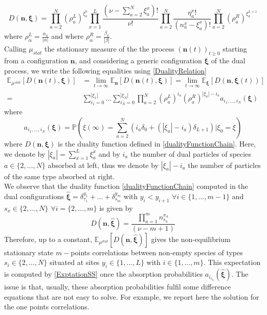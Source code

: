 \documentclass[11pt]{article}
\numberwithin{equation}{section}
\numberwithin{equation}{subsection}
\begin{document}
\begin{equation}\label{dualityFunctionChain}
	D(\bm{n},\bm{\xi})=\prod_{a=2}^{N}\left(\rho_{a}^{L}\right)^{\xi_{a}^{0}}\prod_{x=1}^{L}\frac{(\nu-\sum_{a=2}^{N}\xi_{a}^{x})!}{\nu!}\prod_{a=2}^{N}\frac{\eta_{a}^{x}!}{(n_{a}^{x}-\xi_{a}^{x})!}\prod_{a=2}^{N}\left(\rho_{a}^{R}\right)^{\xi_{a}^{L+1}}
\end{equation}
where $\rho_{\alpha}^{L}=\frac{\alpha_{a}}{|\alpha|}$ and where $\rho_{\alpha}^{R}=\frac{\beta_{a}}{|\beta|}$.\\
Calling $\mu_{stat}$ the stationary measure of the the process $(\bm{n}(t))_{t\geq 0}$ starting from a configuration $\bm{n}$, and considering a generic configuration $\bm{\xi}$ of the dual process, we write the following equalities using \eqref{DualityRelation}
\begin{equation}\label{ExptationSS}
	\begin{split}
		\mathbb{E}_{\mu^{stat}}\left[D(\bm{n}(t),\bm{\xi})\right]&=\lim_{t\to\infty}\mathbb{E}_{\bm{n}}\left[D(\bm{n}(t),\bm{\xi})\right]=\lim_{t\to\infty}\mathbb{E}_{\bm{\xi}}\left[D(\bm{n},\bm{\xi}(t))\right]
		\\=&
		\sum_{i_{1}=0}^{|\xi_{1}|}\ldots\sum_{i_{N}=0}^{|\xi_{N}|}\prod_{a=2}^{N}\left(\rho_{a}^{L}\right)^{i_{a}}\left(\rho_{a}^{R}\right)^{|\xi_{a}|-i_{a}}a_{i_{1},\ldots,i_{N}}(\bm{\xi})
	\end{split}
\end{equation}
where 
\begin{equation}\label{Pass}
	a_{i_{1},\ldots,i_{N}}(\bm{\xi})=\mathbb{P}\left(\xi(\infty)=\sum_{a=2}^{N}\left(i_{a}\delta_{0}+(|\xi_{a}|-i_{a})\delta_{L+1}\right)| \xi_{0}=\xi\right)
\end{equation}
where $D(\bm{n},\bm{\xi})$ is the duality function defined in \eqref{dualityFunctionChain}. Here, we denote by $|\xi_{a}|=\sum_{x=1}^{L}\xi_{a}^{x}$ and by $i_{a}$ the number of dual particles of species $a\in\{2,\ldots,N\}$ absorbed at left, thus we denote by $|\xi_{a}|-i_{a}$ the number of particles of the same type absorbed at right.\\
We observe that the duality function \eqref{dualityFunctionChain} computed in the dual configurations $\bm{\widehat{\xi}}=\delta_{\tau_{1}}^{y_{1}}+\ldots+\delta_{s_{m}}^{y_{m}}$ with $y_{i}<y_{i+1}$ $\forall i\in \{1,\ldots,m-1\}$ and $s_{x}\in \{2,\ldots,N\}$ $\forall i=\{2,\ldots,m\}$ is given by 
\begin{equation}
	D(\bm{n},\bm{\widehat{\xi}})= \frac{\prod_{a=1}^{m}n_{s_{a}}^{x_{a}}}{(\nu-m+1)}
\end{equation}
Therefore, up to a constant, $\mathbb{E}_{\mu^{\text{stat}}}\left[D(\bm{n},\bm{\widehat{\xi}})\right]$ gives the non-equilibrium stationary state $m-$points correlations between non-empty species of types $s_{i}\in\{2,\ldots,N\}$ situated at sites $y_{i}\in\{1,\ldots,L\}$ with $i\in \{1,\ldots,m\}$. This expectation is computed by \eqref{ExptationSS} once the absorption probabilities $a_{i_{s_{a}}}(\widehat{\bm{\xi}})$. The issue is that, usually, these absorption probabilities fulfil some difference equations that are not easy to solve. For example, we report here the solution for the one points correlations. 
\end{document}
